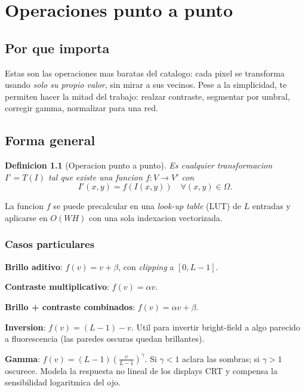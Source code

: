 \documentclass[11pt,a4paper,twoside,openright]{book}
\newtheorem{definicion}{Definicion}[chapter]
\begin{document}
\chapter{Operaciones punto a punto}
\label{ch:punto}

\section{Por que importa}

Estas son las operaciones mas baratas del catalogo: cada pixel se transforma usando \emph{solo su propio valor}, sin mirar a sus vecinos. Pese a la simplicidad, te permiten hacer la mitad del trabajo: realzar contraste, segmentar por umbral, corregir gamma, normalizar para una red.

\section{Forma general}

\begin{definicion}[Operacion punto a punto]
Es cualquier transformacion $I' = T(I)$ tal que existe una funcion $f: V \to V'$ con
\begin{equation}
I'(x,y) = f(I(x,y)) \quad \forall (x,y) \in \Omega.
\end{equation}
\end{definicion}

La funcion $f$ se puede precalcular en una \emph{look-up table} (LUT) de $L$ entradas y aplicarse en $O(WH)$ con una sola indexacion vectorizada.

\subsection{Casos particulares}

\textbf{Brillo aditivo}: $f(v) = v + \beta$, con \emph{clipping} a $[0, L{-}1]$.

\textbf{Contraste multiplicativo}: $f(v) = \alpha v$.

\textbf{Brillo + contraste combinados}: $f(v) = \alpha v + \beta$.

\textbf{Inversion}: $f(v) = (L{-}1) - v$. Util para invertir bright-field a algo parecido a fluorescencia (las paredes oscuras quedan brillantes).

\textbf{Gamma}: $f(v) = (L{-}1)\left(\frac{v}{L{-}1}\right)^\gamma$. Si $\gamma < 1$ aclara las sombras; si $\gamma > 1$ oscurece. Modela la respuesta no lineal de los displays CRT y compensa la sensibilidad logaritmica del ojo.
\end{document}
